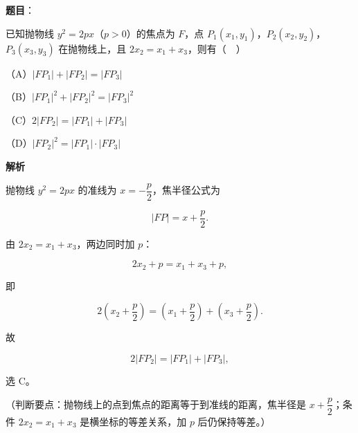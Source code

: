 \begin{answer}

\textbf{题目}：

已知抛物线 $y^2=2px$（$p>0$）的焦点为 $F$，点 $P_1(x_1,y_1)$，$P_2(x_2,y_2)$，$P_3(x_3,y_3)$ 在抛物线上，且 $2x_2=x_1+x_3$，则有（　）

（A）$|FP_1|+|FP_2|=|FP_3|$

（B）$|FP_1|^2+|FP_2|^2=|FP_3|^2$

（C）$2|FP_2|=|FP_1|+|FP_3|$

（D）$|FP_2|^2=|FP_1|\cdot|FP_3|$

\textbf{解析}

抛物线 $y^2=2px$ 的准线为 $x=-\dfrac p2$，焦半径公式为

\nopagebreak[4]
\[|FP|=x+\frac p2.\]

由 $2x_2=x_1+x_3$，两边同时加 $p$：

\nopagebreak[4]
\[2x_2+p=x_1+x_3+p,\]

即

\nopagebreak[4]
\[2\left(x_2+\frac p2\right)=\left(x_1+\frac p2\right)+\left(x_3+\frac p2\right).\]

故

\nopagebreak[4]
\[2|FP_2|=|FP_1|+|FP_3|,\]

选 C。

（判断要点：抛物线上的点到焦点的距离等于到准线的距离，焦半径是 $x+\dfrac p2$；条件 $2x_2=x_1+x_3$ 是横坐标的等差关系，加 $p$ 后仍保持等差。）


\end{answer}
